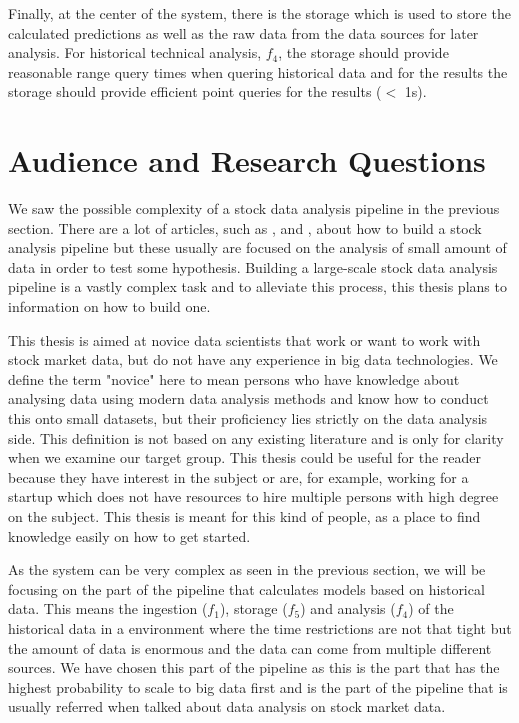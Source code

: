 Finally, at the center of the system, there is the storage which is used to store the calculated predictions as well as the raw data from the data sources for later analysis.
For historical technical analysis, $f_4$, the storage should provide reasonable range query times when quering historical data and for the results the storage should provide efficient point queries for the results ($<$ 1s).

\section{Audience and Research Questions}

We saw the possible complexity of a stock data analysis pipeline in the previous section.
There are a lot of articles, such as \cite{adresic}, \cite{saha} and \cite{wenga}, about how to build a stock analysis pipeline but these usually are focused on the analysis of small amount of data in order to test some hypothesis.
Building a large-scale stock data analysis pipeline is a vastly complex task and to alleviate this process, this thesis plans to information on how to build one.

This thesis is aimed at novice data scientists that work or want to work with stock market data, but do not have any experience in big data technologies.
We define the term "novice" here to mean persons who have knowledge about analysing data using modern data analysis methods and know how to conduct this onto small datasets, but their proficiency lies strictly on the data analysis side.
This definition is not based on any existing literature and is only for clarity when we examine our target group.
This thesis could be useful for the reader because they have interest in the subject or are, for example, working for a startup which does not have resources to hire multiple persons with high degree on the subject.
This thesis is meant for this kind of people, as a place to find knowledge easily on how to get started.

As the system can be very complex as seen in the previous section, we will be focusing on the part of the pipeline that calculates models based on historical data.
This means the ingestion ($f_1$), storage ($f_5$) and analysis ($f_4$) of the historical data in a environment where the time restrictions are not that tight but the amount of data is enormous and the data can come from multiple different sources.
We have chosen this part of the pipeline as this is the part that has the highest probability to scale to big data first and is the part of the pipeline that is usually referred when talked about data analysis on stock market data.

